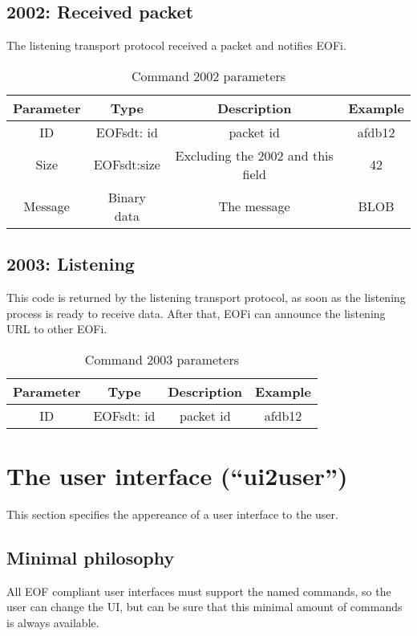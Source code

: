 \documentclass[12pt,a4paper]{book}
\begin{document}
\subsection{2002: Received packet}
The listening transport protocol received a packet and notifies EOFi.
\begin{longtable}{|c|c|c|c|}
\caption{Command 2002 parameters}\\
\hline
\textbf{Parameter} & \textbf{Type} & \textbf{Description} & \textbf{Example}\\
\hline
ID & EOFsdt: id & packet id & afdb12\\
\hline
Size & EOFsdt:size & Excluding the 2002 and this field & 42\\
\hline
Message & Binary data & The message & BLOB\\
\hline
\end{longtable}
\subsection{2003: Listening}
This code is returned by the listening transport protocol, as soon as the
listening process is ready to receive data. After that, EOFi can announce
the listening URL to other EOFi.
\begin{longtable}{|c|c|c|c|}
\caption{Command 2003 parameters}\\
\hline
\textbf{Parameter} & \textbf{Type} & \textbf{Description} & \textbf{Example}\\
\hline
ID & EOFsdt: id & packet id & afdb12\\
\hline
\end{longtable}
\section{The user interface ("`ui2user"')}
This section specifies the appereance of a user interface to the user.
\subsection{Minimal philosophy}
All EOF compliant user interfaces must support the named commands, so the
user can change the UI, but can be sure that this minimal amount of
commands is always available.
\end{document}
